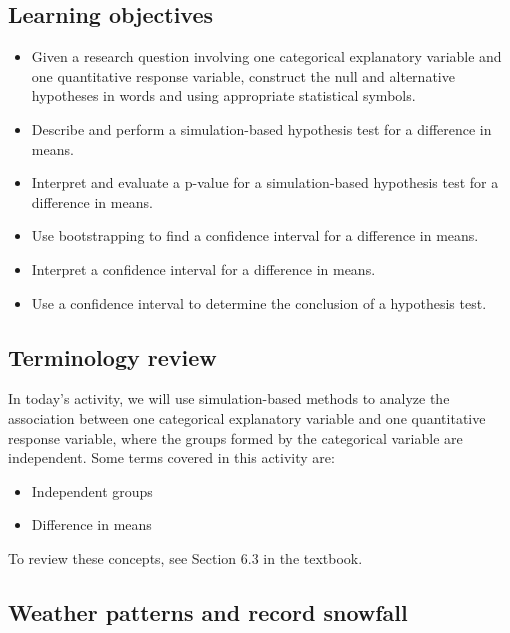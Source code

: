\documentclass[
]{report}
\begin{document}
\hypertarget{learning-objectives-17}{%
\subsection{Learning objectives}\label{learning-objectives-17}}

\begin{itemize}
\item
  Given a research question involving one categorical explanatory variable and one quantitative response variable, construct the null and alternative hypotheses
  in words and using appropriate statistical symbols.
\item
  Describe and perform a simulation-based hypothesis test for a difference in means.
\item
  Interpret and evaluate a p-value for a simulation-based hypothesis test for a difference in means.
\item
  Use bootstrapping to find a confidence interval for a difference in means.
\item
  Interpret a confidence interval for a difference in means.
\item
  Use a confidence interval to determine the conclusion of a hypothesis test.
\end{itemize}

\hypertarget{terminology-review-18}{%
\subsection{Terminology review}\label{terminology-review-18}}

In today's activity, we will use simulation-based methods to analyze the association between one categorical explanatory variable and one quantitative response variable, where the groups formed by the categorical variable are independent. Some terms covered in this activity are:

\begin{itemize}
\item
  Independent groups
\item
  Difference in means
\end{itemize}

To review these concepts, see Section 6.3 in the textbook.

\hypertarget{weather-patterns-and-record-snowfall}{%
\subsection{Weather patterns and record snowfall}\label{weather-patterns-and-record-snowfall}}
\end{document}
